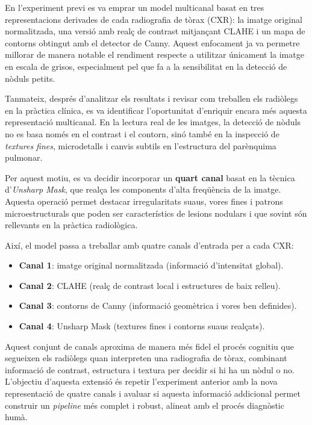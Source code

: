 \documentclass[12pt,a4paper]{article}
\begin{document}
En l'experiment previ es va emprar un model multicanal basat en tres representacions derivades de cada radiografia de tòrax (CXR): la imatge original normalitzada, una versió amb realç de contrast mitjançant CLAHE i un mapa de contorns obtingut amb el detector de Canny. Aquest enfocament ja va permetre millorar de manera notable el rendiment respecte a utilitzar únicament la imatge en escala de grisos, especialment pel que fa a la sensibilitat en la detecció de nòduls petits.

Tanmateix, després d'analitzar els resultats i revisar com treballen els radiòlegs en la pràctica clínica, es va identificar l’oportunitat d’enriquir encara més aquesta representació multicanal. En la lectura real de les imatges, la detecció de nòduls no es basa només en el contrast i el contorn, sinó també en la inspecció de \textit{textures fines}, microdetalls i canvis subtils en l’estructura del parènquima pulmonar.

Per aquest motiu, es va decidir incorporar un \textbf{quart canal} basat en la tècnica d’\textit{Unsharp Mask}, que realça les components d’alta freqüència de la imatge. Aquesta operació permet destacar irregularitats suaus, vores fines i patrons microestructurals que poden ser característics de lesions nodulars i que sovint són rellevants en la pràctica radiològica.

Així, el model passa a treballar amb quatre canals d’entrada per a cada CXR:

\begin{itemize}
    \item \textbf{Canal 1}: imatge original normalitzada (informació d’intensitat global).
    \item \textbf{Canal 2}: CLAHE (realç de contrast local i estructures de baix relleu).
    \item \textbf{Canal 3}: contorns de Canny (informació geomètrica i vores ben definides).
    \item \textbf{Canal 4}: Unsharp Mask (textures fines i contorns suaus realçats).
\end{itemize}

Aquest conjunt de canals aproxima de manera més fidel el procés cognitiu que segueixen els radiòlegs quan interpreten una radiografia de tòrax, combinant informació de contrast, estructura i textura per decidir si hi ha un nòdul o no. L’objectiu d’aquesta extensió és repetir l’experiment anterior amb la nova representació de quatre canals i avaluar si aquesta informació addicional permet construir un \textit{pipeline} més complet i robust, alineat amb el procés diagnòstic humà.
\end{document}
